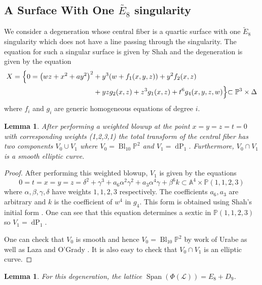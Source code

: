 \documentclass[a4paper]{amsart}
\theoremstyle{definition}
\theoremstyle{plain}
\newtheorem{lemma}[defn]{Lemma}
\theoremstyle{remark}
\newcommand{\PS}{\mathbb{P}}
\newcommand{\A}{\mathbb{A}}
\begin{document}
\subsection{A Surface With One $\widetilde{E_8}$ singularity}\label{sect: E8 singularity and no line}
We consider a degeneration whose central fiber is a quartic surface with one $\widetilde{E}_8$ singularity which does not have a line passing through the singularity. The equation for such a singular surface is given by Shah \cite[S-4.1]{Shah81} and the degeneration is given by the equation
\begin{align*}
   X = \Bigl\{0= \left(wz+x^2+ay^2\right)^2 &+y^3(w+f_1(x,y,z))+y^2f_2(x,z)\\&+yzg_2(x,z)+z^3g_1(x,z)+t^6g_4(x,y,z,w) \Bigl\} \subset \mathbb{P}^3 \times \Delta
\end{align*}
where $f_i$ and $g_i$ are generic homogeneous equations of degree $i$.

\begin{lemma}\label{blow 1 E8}
After performing a weighted blowup at the point $x=y=z=t=0$ with corresponding weights (1,2,3,1) the total transform of the central fiber has two components $V_0 \cup V_1$ where $V_0 = \operatorname{Bl}_{10}\PS^2$ and $V_1=\operatorname{dP}_{1}$. Furthermore, $V_0\cap V_1$ is a smooth elliptic curve.
\end{lemma}

\begin{proof}
After performing this weighted blowup, $V_1$ is given by the equations
$$0=t=x=y=z=\delta^2+\gamma^3+a_6\alpha^2\gamma^2+a_3\alpha^4\gamma+\beta^6k \subset \A^4\times\PS(1,1,2,3)$$
where $\alpha,\beta,\gamma,\delta$ have weights $1,1,2,3$ respectively. The coefficients $a_6, a_3$ are arbitrary and $k$ is the coefficient of $w^4$ in $g_4$. This form is obtained using Shah's initial form \cite[p. 281]{Shah81}. One can see that this equation determines a sextic in $\PS(1,1,2,3)$ so $V_1=\operatorname{dP}_1$.

One can check that $V_0$ is smooth and hence $V_0=\operatorname{Bl}_{10}\PS^2$ by work of Urabe \cite[Proposition 1.5, p.1192]{Ura84} as well as Laza and O'Grady \cite[Remark 4.2]{LOG19}. It is also easy to check that $V_0\cap V_1$ is an elliptic curve.
\end{proof}

\begin{lemma}\label{lemma:root lattice E8D9}
For this degeneration, the lattice $\operatorname{Span}(\Phi(\mathscr{L}))=E_8+D_9$.
\end{lemma}
\end{document}

